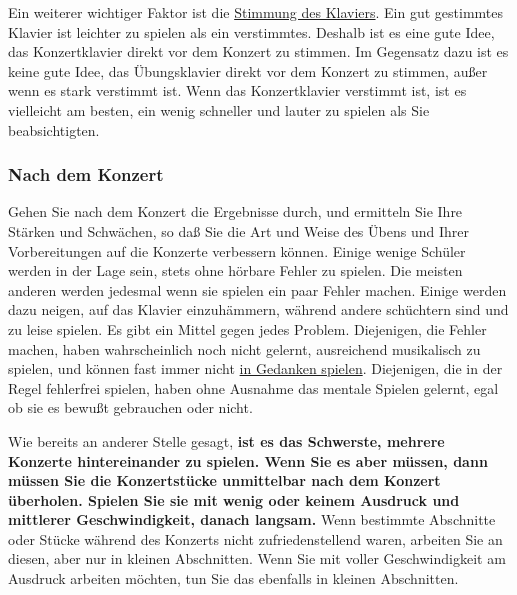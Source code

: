 \label{c1iii14Stimmung}

Ein weiterer wichtiger Faktor ist die \hyperref[c2_1]{Stimmung des Klaviers}.
Ein gut gestimmtes Klavier ist leichter zu spielen als ein verstimmtes.
Deshalb ist es eine gute Idee, das Konzertklavier direkt vor dem Konzert zu stimmen.
Im Gegensatz dazu ist es keine gute Idee, das Übungsklavier direkt vor dem Konzert zu stimmen, außer wenn es stark verstimmt ist.
Wenn das Konzertklavier verstimmt ist, ist es vielleicht am besten, ein wenig schneller und lauter zu spielen als Sie beabsichtigten.


\subsubsection{Nach dem Konzert}
\label{c1iii14i}

Gehen Sie nach dem Konzert die Ergebnisse durch, und ermitteln Sie Ihre Stärken und Schwächen, so daß Sie die Art und Weise des Übens und Ihrer Vorbereitungen auf die Konzerte verbessern können.
Einige wenige Schüler werden in der Lage sein, stets ohne hörbare Fehler zu spielen.
Die meisten anderen werden jedesmal wenn sie spielen ein paar Fehler machen.
Einige werden dazu neigen, auf das Klavier einzuhämmern, während andere schüchtern sind und zu leise spielen.
Es gibt ein Mittel gegen jedes Problem.
Diejenigen, die Fehler machen, haben wahrscheinlich noch nicht gelernt, ausreichend musikalisch zu spielen, und können fast immer nicht \hyperref[c1ii12mental]{in Gedanken spielen}.
Diejenigen, die in der Regel fehlerfrei spielen, haben ohne Ausnahme das mentale Spielen gelernt, egal ob sie es bewußt gebrauchen oder nicht.

Wie bereits an anderer Stelle gesagt, \textbf{ist es das Schwerste, mehrere Konzerte hintereinander zu spielen.
Wenn Sie es aber müssen, dann müssen Sie die Konzertstücke unmittelbar nach dem Konzert überholen.
Spielen Sie sie mit wenig oder keinem Ausdruck und mittlerer Geschwindigkeit, danach langsam.}
Wenn bestimmte Abschnitte oder Stücke während des Konzerts nicht zufriedenstellend waren, arbeiten Sie an diesen, aber nur in kleinen Abschnitten.
Wenn Sie mit voller Geschwindigkeit am Ausdruck arbeiten möchten, tun Sie das ebenfalls in kleinen Abschnitten.



